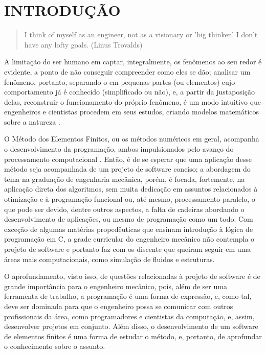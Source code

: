

\chapter{INTRODUÇÃO}

\begin{quote}
    I think of myself as an engineer, not as a visionary or 'big thinker.' I don't have any lofty goals.
    (Linus Trovalds)  
\end{quote}

A limitação do ser humano em captar, integralmente, os fenômenos ao seu redor é evidente, a ponto de não conseguir compreender como eles se dão; analisar um fenômeno, portanto, separando-o em pequenas partes (ou elementos) cujo comportamento já é conhecido (simplificado ou não), e, a partir da justaposição delas, reconstruir o funcionamento do próprio fenômeno, é um modo intuitivo que engenheiros e cientistas procedem em seus estudos, criando modelos matemáticos sobre a natureza \cite[p. 2]{Zin}.



O Método dos Elementos Finitos, ou os métodos numéricos em geral, acompanha o desenvolvimento da programação, ambos impulsionados pelo avanço do processamento computacional \cite{Onate}. Então, é de se esperar que uma aplicação desse método seja acompanhada de um projeto de software conciso; a abordagem do tema na graduação de engenharia mecânica, porém, é focada, fortemente, na aplicação direta dos algoritmos, sem muita dedicação em assuntos relacionados à otimização e à programação funcional ou, até mesmo, processamento paralelo, o que pode ser devido, dentre outros aspectos, a falta de cadeiras abordando o desenvolvimento de aplicações, ou mesmo de programação como um todo. Com exceção de algumas matérias propedêuticas que ensinam introdução à lógica de programação em C, a grade curricular do engenheiro mecânico não contempla o projeto de software e portanto faz com os discente que queiram seguir em uma áreas mais computacionais, como simulação de fluidos e estruturas.

O aprofundamento, visto isso, de questões relacionadas à projeto de software é de grande importância para o engenheiro mecânico, pois, além de ser uma ferramenta de trabalho, a programação é uma forma de expressão, e, como tal, deve ser dominada para que o engenheiro possa se comunicar com outros profissionais da área, como programadores e cientistas da computação, e, assim, desenvolver projetos em conjunto. Além disso, o desenvolvimento de um software de elementos finitos é uma forma de estudar o método, e, portanto, de aprofundar o conhecimento sobre o assunto.


